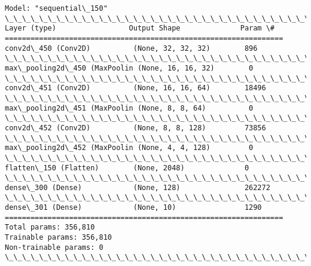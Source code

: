 \documentclass[11pt]{article}
\begin{document}
    \begin{Verbatim}[commandchars=\\\{\}]
Model: "sequential\_150"
\_\_\_\_\_\_\_\_\_\_\_\_\_\_\_\_\_\_\_\_\_\_\_\_\_\_\_\_\_\_\_\_\_\_\_\_\_\_\_\_\_\_\_\_\_\_\_\_\_\_\_\_\_\_\_\_\_\_\_\_\_\_\_\_\_
Layer (type)                 Output Shape              Param \#
=================================================================
conv2d\_450 (Conv2D)          (None, 32, 32, 32)        896
\_\_\_\_\_\_\_\_\_\_\_\_\_\_\_\_\_\_\_\_\_\_\_\_\_\_\_\_\_\_\_\_\_\_\_\_\_\_\_\_\_\_\_\_\_\_\_\_\_\_\_\_\_\_\_\_\_\_\_\_\_\_\_\_\_
max\_pooling2d\_450 (MaxPoolin (None, 16, 16, 32)        0
\_\_\_\_\_\_\_\_\_\_\_\_\_\_\_\_\_\_\_\_\_\_\_\_\_\_\_\_\_\_\_\_\_\_\_\_\_\_\_\_\_\_\_\_\_\_\_\_\_\_\_\_\_\_\_\_\_\_\_\_\_\_\_\_\_
conv2d\_451 (Conv2D)          (None, 16, 16, 64)        18496
\_\_\_\_\_\_\_\_\_\_\_\_\_\_\_\_\_\_\_\_\_\_\_\_\_\_\_\_\_\_\_\_\_\_\_\_\_\_\_\_\_\_\_\_\_\_\_\_\_\_\_\_\_\_\_\_\_\_\_\_\_\_\_\_\_
max\_pooling2d\_451 (MaxPoolin (None, 8, 8, 64)          0
\_\_\_\_\_\_\_\_\_\_\_\_\_\_\_\_\_\_\_\_\_\_\_\_\_\_\_\_\_\_\_\_\_\_\_\_\_\_\_\_\_\_\_\_\_\_\_\_\_\_\_\_\_\_\_\_\_\_\_\_\_\_\_\_\_
conv2d\_452 (Conv2D)          (None, 8, 8, 128)         73856
\_\_\_\_\_\_\_\_\_\_\_\_\_\_\_\_\_\_\_\_\_\_\_\_\_\_\_\_\_\_\_\_\_\_\_\_\_\_\_\_\_\_\_\_\_\_\_\_\_\_\_\_\_\_\_\_\_\_\_\_\_\_\_\_\_
max\_pooling2d\_452 (MaxPoolin (None, 4, 4, 128)         0
\_\_\_\_\_\_\_\_\_\_\_\_\_\_\_\_\_\_\_\_\_\_\_\_\_\_\_\_\_\_\_\_\_\_\_\_\_\_\_\_\_\_\_\_\_\_\_\_\_\_\_\_\_\_\_\_\_\_\_\_\_\_\_\_\_
flatten\_150 (Flatten)        (None, 2048)              0
\_\_\_\_\_\_\_\_\_\_\_\_\_\_\_\_\_\_\_\_\_\_\_\_\_\_\_\_\_\_\_\_\_\_\_\_\_\_\_\_\_\_\_\_\_\_\_\_\_\_\_\_\_\_\_\_\_\_\_\_\_\_\_\_\_
dense\_300 (Dense)            (None, 128)               262272
\_\_\_\_\_\_\_\_\_\_\_\_\_\_\_\_\_\_\_\_\_\_\_\_\_\_\_\_\_\_\_\_\_\_\_\_\_\_\_\_\_\_\_\_\_\_\_\_\_\_\_\_\_\_\_\_\_\_\_\_\_\_\_\_\_
dense\_301 (Dense)            (None, 10)                1290
=================================================================
Total params: 356,810
Trainable params: 356,810
Non-trainable params: 0
\_\_\_\_\_\_\_\_\_\_\_\_\_\_\_\_\_\_\_\_\_\_\_\_\_\_\_\_\_\_\_\_\_\_\_\_\_\_\_\_\_\_\_\_\_\_\_\_\_\_\_\_\_\_\_\_\_\_\_\_\_\_\_\_\_
    \end{Verbatim}
\end{document}
